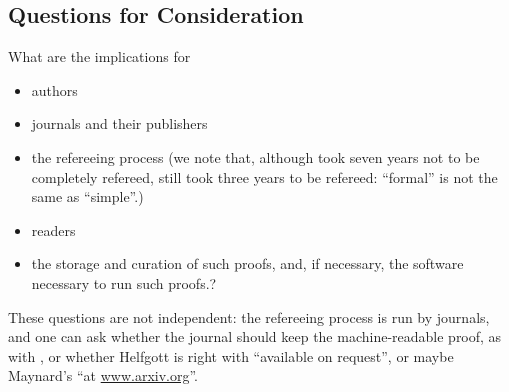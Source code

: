 \subsection{Questions for Consideration}
What are the implications for
\begin{itemize}
\item authors
\item journals and their publishers
\item the refereeing process (we note that, although \cite{Hales2005} took seven years not to be completely refereed,  \cite{Halesetal2017a} still took three years to be refereed: ``formal'' is not the same as ``simple''.) %
\item readers
\item the storage and curation of such proofs, and, if necessary, the software necessary to run such proofs.?%
\end{itemize}
These questions are not independent: the refereeing process is run by journals, and one can ask whether the journal should keep the machine-readable proof, as with \cite{Hales2005}, or whether Helfgott is right with ``available on request'', or maybe Maynard's ``at \url{www.arxiv.org}''.

